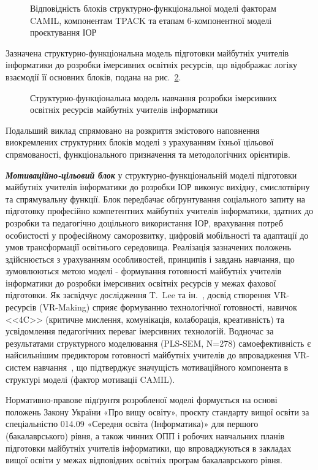 \begin{figure}[!h]
\centering

\caption{Відповідність блоків структурно-функціональної моделі факторам CAMIL, компонентам TPACK та етапам 6-компонентної моделі проєктування ІОР}
\label{fig:model_alignment}
\end{figure}

Зазначена структурно-функціональна модель підготовки майбутніх учителів інформатики до розробки імерсивних освітніх ресурсів, що відображає логіку взаємодії її основних блоків, подана на рис.~\ref{fig:2.3}.

\begin{figure}[!h]
\centering

\caption{Структурно-функціональна модель навчання розробки імерсивних освітніх ресурсів майбутніх учителів інформатики}
\label{fig:2.3}
\end{figure}

Подальший виклад спрямовано на розкриття змістового наповнення виокремлених структурних блоків моделі з урахуванням їхньої цільової спрямованості, функціонального призначення та методологічних орієнтирів.

\emph{\textbf{Мотиваційно-цільовий блок}} у структурно-функціональній моделі підготовки майбутніх учителів інформатики до розробки ІОР виконує вихідну, смислотвірну та спрямувальну функції. Блок передбачає обґрунтування соціального запиту на підготовку професійно компетентних майбутніх учителів інформатики, здатних до розробки та педагогічно доцільного використання ІОР, врахування потреб особистості у професійному саморозвитку, цифровій мобільності та адаптації до умов трансформації освітнього середовища. Реалізація зазначених положень здійснюється з урахуванням особливостей, принципів і завдань навчання, що зумовлюються метою моделі - формування готовності майбутніх учителів інформатики до розробки імерсивних освітніх ресурсів у межах фахової підготовки. Як засвідчує дослідження T.~Lee та ін.~\cite{Lee2022VRMaking}, досвід створення VR-ресурсів (VR-Making) сприяє формуванню технологічної готовності, навичок <<4C>> (критичне мислення, комунікація, колаборація, креативність) та усвідомлення педагогічних переваг імерсивних технологій. Водночас за результатами структурного моделювання (PLS-SEM, N=278) самоефективність є найсильнішим предиктором готовності майбутніх учителів до впровадження VR-систем навчання~\cite{Xie2024UTAUT2VR}, що підтверджує значущість мотиваційного компонента в структурі моделі (фактор мотивації CAMIL).

Нормативно-правове підґрунтя розробленої моделі формується на основі положень Закону України «Про вищу освіту», проєкту стандарту вищої освіти за спеціальністю 014.09 «Середня освіта (Інформатика)» для першого (бакалаврського) рівня, а також чинних ОПП і робочих навчальних планів підготовки майбутніх учителів інформатики, що впроваджуються в закладах вищої освіти у межах відповідних освітніх програм бакалаврського рівня.

